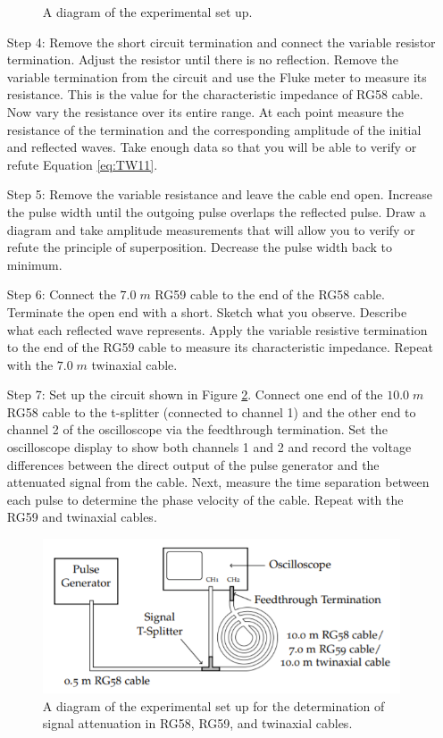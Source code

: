 \begin{itemize}[leftmargin = 50pt]
\begin{figure}[H]
    \caption{A diagram of the experimental set up.}
    \label{fig:TW2}
\end{figure}
    \item[Step 4:] Remove the short circuit termination and connect the variable resistor termination. Adjust the resistor until there is no reflection. Remove the variable termination from the circuit and use the Fluke meter to measure its resistance. This is the value for the characteristic impedance of RG58 cable. Now vary the resistance over its entire range. At each point measure the resistance of the termination and the corresponding amplitude of the initial and reflected waves. Take enough data so that you will be able to verify or refute Equation \ref{eq:TW11}.
    \item[Step 5:] Remove the variable resistance and leave the cable end open. Increase the pulse width until the outgoing pulse overlaps the reflected pulse. Draw a diagram and take amplitude measurements that will allow you to verify or refute the principle of superposition. Decrease the pulse width back to minimum.
    \item[Step 6:] Connect the $7.0\; m$ RG59 cable to the end of the RG58 cable. Terminate the open end with a short. Sketch what you observe. Describe what each reflected wave represents. Apply the variable resistive termination to the end of the RG59 cable to measure its characteristic impedance. Repeat with the $7.0 \;m$ twinaxial cable.
    \item[Step 7:] Set up the circuit shown in Figure \ref{fig:TW3}. Connect one end of the $10.0 \;m$ RG58 cable to the t-splitter (connected to channel 1) and the other end to channel 2 of the oscilloscope via the feedthrough termination. Set the oscilloscope display to show both channels 1 and 2 and record the voltage differences between the direct output of the pulse generator and the attenuated signal from the cable. Next, measure the time separation between each pulse to determine the phase velocity of the cable. Repeat with the RG59 and twinaxial cables.
        \begin{figure}[H]
    \centering
    \includegraphics[scale = 0.8]{Images/TW3.PNG}
    \caption{A diagram of the experimental set up for the determination of signal attenuation in RG58, RG59, and twinaxial cables.}
    \label{fig:TW3}
\end{figure}
\end{itemize}

